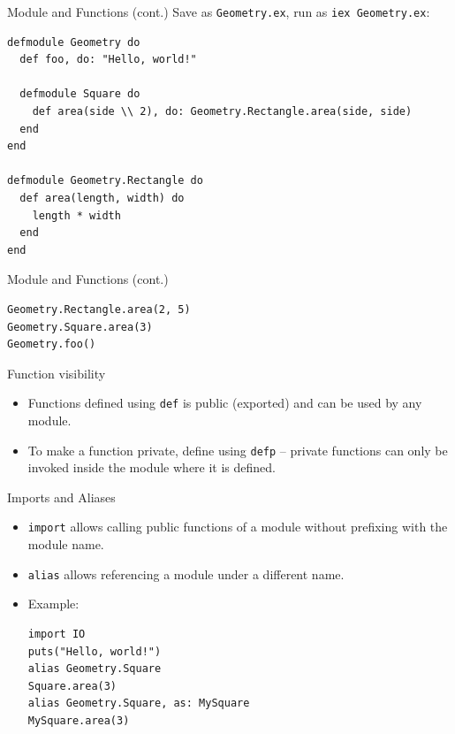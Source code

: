 \documentclass[12pt]{beamer}
\begin{document}
\begin{frame}[fragile]{Module and Functions (cont.)}
  Save as \texttt{Geometry.ex}, run as \texttt{iex Geometry.ex}:
  \begin{verbatim}
defmodule Geometry do
  def foo, do: "Hello, world!"

  defmodule Square do
    def area(side \\ 2), do: Geometry.Rectangle.area(side, side)
  end
end

defmodule Geometry.Rectangle do
  def area(length, width) do
    length * width
  end
end
  \end{verbatim}
\end{frame}

\begin{frame}[fragile]{Module and Functions (cont.)}
  \begin{verbatim}
Geometry.Rectangle.area(2, 5)
Geometry.Square.area(3)
Geometry.foo()
  \end{verbatim}
\end{frame}

\begin{frame}{Function visibility}
  \begin{itemize}
    \item Functions defined using \texttt{def} is public (exported) and can be used by any module.
    \item To make a function private, define using \texttt{defp} -- private functions can only be invoked inside the module where it is defined.
  \end{itemize}
\end{frame}

\begin{frame}[fragile]{Imports and Aliases}
  \begin{itemize}
    \item \texttt{import} allows calling public functions of a module without prefixing with the module name.
    \item \texttt{alias} allows referencing a module under a different name.
    \item Example:
          \begin{verbatim}
import IO
puts("Hello, world!")
alias Geometry.Square
Square.area(3)
alias Geometry.Square, as: MySquare
MySquare.area(3)
  \end{verbatim}
  \end{itemize}
\end{frame}
\end{document}
